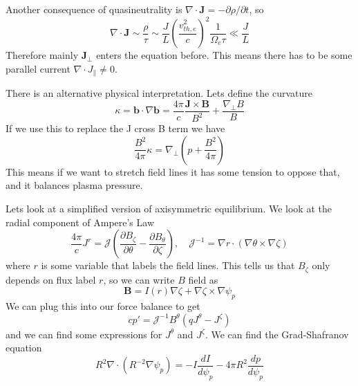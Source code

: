 \documentclass[letterpaper, 11pt]{article}
\numberwithin{equation}{section}
\numberwithin{figure}{section}
\begin{document}
Another consequence of quasineutrality is $\nabla\cdot \mathbf{J} = -\partial
\rho / \partial t$, so
\begin{equation}
  \label{eq:15}
  \nabla\cdot \mathbf{J} \sim \frac{\rho}{\tau} \sim \frac{J}{L}\left( \frac{v_{th,e}^2}{c} \right)^2\frac{1}{\Omega_{e}\tau} \ll \frac{J}{L}
\end{equation}
Therefore mainly $\mathbf{J}_\perp$ enters the equation before. This means there
has to be some parallel current $\nabla\cdot J_{\parallel} \neq 0$.

There is an alternative physical interpretation. Lets define the curvature
\begin{equation}
  \label{eq:16}
  \kappa = \mathbf{b}\cdot\nabla \mathbf{b} = \frac{4\pi}{c}\frac{\mathbf{J}\times \mathbf{B}}{B^2} + \frac{\nabla_{\perp}B}{B}
\end{equation}
If we use this to replace the J cross B term we have
\begin{equation}
  \label{eq:17}
  \frac{B^2}{4\pi}\kappa = \nabla_{\perp} \left( p + \frac{B^2}{4\pi} \right)
\end{equation}
This means if we want to stretch field lines it has some tension to oppose that,
and it balances plasma pressure.

Lets look at a simplified version of axisymmetric equilibrium. We look at the
radial component of Ampere's Law
\begin{equation}
  \label{eq:18}
  \frac{4\pi}{c}J^r = \mathcal{J}\left( \frac{\partial B_{\zeta}}{\partial \theta} - \frac{\partial B_{\theta}}{\partial\zeta} \right) ,\quad \mathcal{J}^{-1} = \nabla r\cdot(\nabla\theta\times\nabla\zeta)
\end{equation}
where $r$ is some variable that labels the field lines. This tells us that
$B_{\zeta}$ only depends on flux label $r$, so we can write $B$ field as
\begin{equation}
  \label{eq:19}
  \mathbf{B} = I(r)\nabla\zeta + \nabla\zeta \times \nabla \psi_p
\end{equation}
We can plug this into our force balance to get
\begin{equation}
  \label{eq:20}
  cp' = \mathcal{J}^{-1}B^{\theta}(qJ^{\theta} - J^{\zeta})
\end{equation}
and we can find some expressions for $J^{\theta}$ and $J^{\zeta}$. We can find
the Grad-Shafranov equation
\begin{equation}
  \label{eq:21}
  R^2\nabla\cdot(R^{-2}\nabla\psi_p) = -I\frac{dI}{d\psi_p} - 4\pi R^2\frac{dp}{d\psi_p}
\end{equation}
\end{document}

